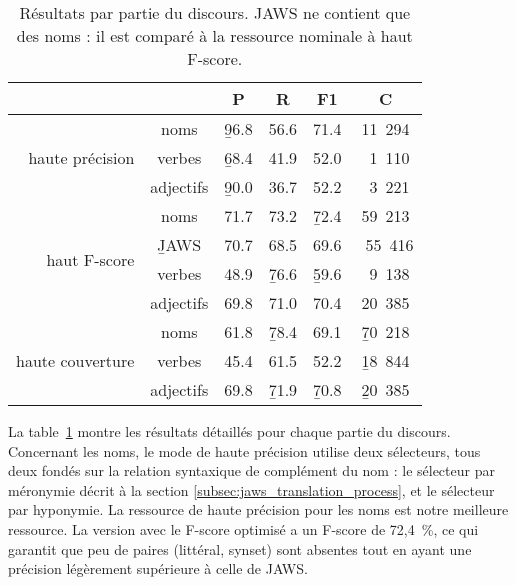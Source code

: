 \begin{table}[ht]
\centering
\begin{tabular}{rccccc}
  \toprule
                                    &           &     P    &     R    & F1       &    C       \\ \hline
  \multirow{3}{*}{haute précision}  & noms      & \b{96.8} & 56.6     & 71.4     & 11~294     \\ 
                                    & verbes    & \b{68.4} & 41.9     & 52.0     & ~1~110     \\ 
                                    & adjectifs & \b{90.0} & 36.7     & 52.2     & ~3~221     \\ \hline
  \multirow{4}{*}{haut F-score}     & noms      & 71.7     & 73.2     & \b{72.4} & 59~213     \\ 
                                    & \b{JAWS}  & 70.7     & 68.5     & 69.6     & ~55~416    \\
                                    & verbes    & 48.9     & \b{76.6} & \b{59.6} & ~9~138     \\ 
                                    & adjectifs & 69.8     & 71.0     & 70.4     & 20~385     \\ \hline
  \multirow{3}{*}{haute couverture} & noms      & 61.8     & \b{78.4} & 69.1     & \b{70~218} \\ 
                                    & verbes    & 45.4     & 61.5     & 52.2     & \b{18~844} \\ 
                                    & adjectifs & 69.8     & \b{71.9} & \b{70.8} & \b{20~385} \\ 
  \bottomrule
\end{tabular}

\caption{\protect\centering\label{table:posfull}Résultats par partie du
discours. JAWS ne contient que des noms : il est comparé à la ressource
nominale à haut F-score.}

\end{table}

La table~\ref{table:posfull} montre les résultats détaillés pour chaque partie
du discours. Concernant les noms, le mode de haute précision utilise deux
sélecteurs, tous deux fondés sur la relation syntaxique de complément du nom :
le sélecteur par méronymie décrit à la section
\ref{subsec:jaws_translation_process}, et le sélecteur par hyponymie. La
ressource de haute précision pour les noms est notre meilleure ressource. La
version avec le F-score optimisé a un F-score de 72,4~\%, ce qui garantit que
peu de paires (littéral, synset) sont absentes tout en ayant une précision
légèrement supérieure à celle de JAWS.

